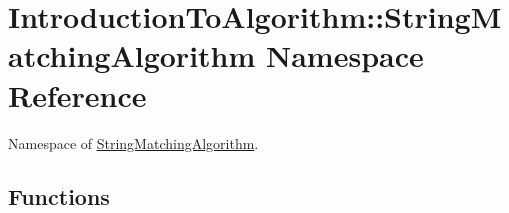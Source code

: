 \hypertarget{namespace_introduction_to_algorithm_1_1_string_matching_algorithm}{}\section{Introduction\+To\+Algorithm\+:\+:String\+Matching\+Algorithm Namespace Reference}
\label{namespace_introduction_to_algorithm_1_1_string_matching_algorithm}


Namespace of \hyperlink{namespace_introduction_to_algorithm_1_1_string_matching_algorithm}{String\+Matching\+Algorithm}.  


\subsection*{Functions}
